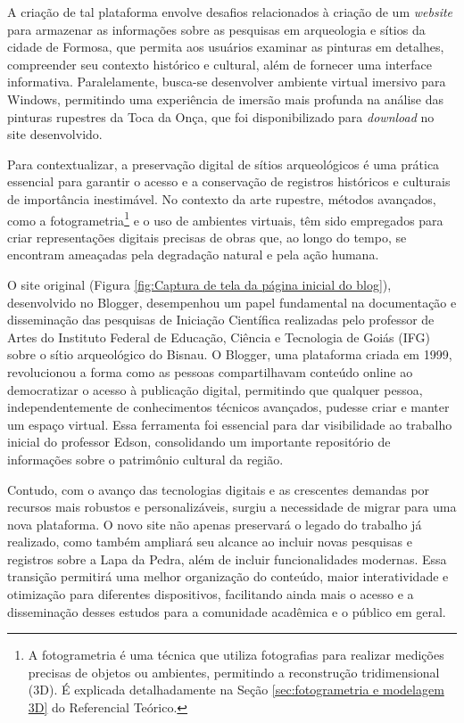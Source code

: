A criação de tal plataforma envolve desafios relacionados à criação de um \textit{website} para armazenar as informações sobre as pesquisas em arqueologia e sítios da cidade de Formosa, que permita aos usuários examinar as pinturas em detalhes, compreender seu contexto histórico e cultural, além de fornecer uma interface informativa. Paralelamente, busca-se desenvolver ambiente virtual imersivo para Windows, permitindo uma experiência de imersão mais profunda na análise das pinturas rupestres da Toca da Onça, que foi disponibilizado para \textit{download} no site desenvolvido. 

Para contextualizar, a preservação digital de sítios arqueológicos é uma prática essencial para garantir o acesso e a conservação de registros históricos e culturais de importância inestimável. No contexto da arte rupestre, métodos avançados, como a fotogrametria\footnote{A fotogrametria é uma técnica que utiliza fotografias para realizar medições precisas de objetos ou ambientes, permitindo a reconstrução tridimensional (3D). É explicada detalhadamente na Seção \ref{sec:fotogrametria e modelagem 3D} do Referencial Teórico.} e o uso de ambientes virtuais, têm sido empregados para criar representações digitais precisas de obras que, ao longo do tempo, se encontram ameaçadas pela degradação natural e pela ação humana.

O site original (Figura \ref{fig:Captura de tela da página inicial do blog}), desenvolvido no Blogger, desempenhou um papel fundamental na documentação e disseminação das pesquisas de Iniciação Científica realizadas pelo professor de Artes do Instituto Federal de Educação, Ciência e Tecnologia de Goiás (IFG) sobre o sítio arqueológico do Bisnau. O Blogger, uma plataforma criada em 1999, revolucionou a forma como as pessoas compartilhavam conteúdo online ao democratizar o acesso à publicação digital, permitindo que qualquer pessoa, independentemente de conhecimentos técnicos avançados, pudesse criar e manter um espaço virtual. Essa ferramenta foi essencial para dar visibilidade ao trabalho inicial do professor Edson, consolidando um importante repositório de informações sobre o patrimônio cultural da região.

Contudo, com o avanço das tecnologias digitais e as crescentes demandas por recursos mais robustos e personalizáveis, surgiu a necessidade de migrar para uma nova plataforma. O novo site não apenas preservará o legado do trabalho já realizado, como também ampliará seu alcance ao incluir novas pesquisas e registros sobre a Lapa da Pedra, além de incluir funcionalidades modernas. Essa transição permitirá uma melhor organização do conteúdo, maior interatividade e otimização para diferentes dispositivos, facilitando ainda mais o acesso e a disseminação desses estudos para a comunidade acadêmica e o público em geral.


